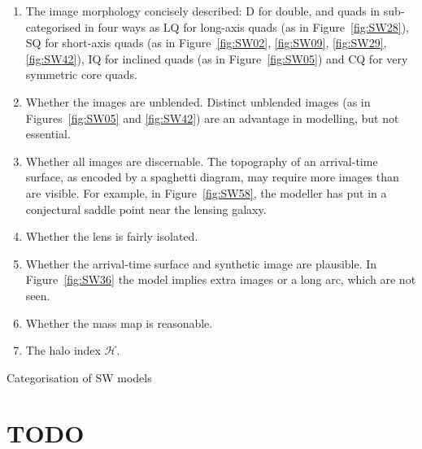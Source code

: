 \documentclass[fleqn,usenatbib]{mnras}
\newcommand{\figref}[1]{\ref{fig:#1}}
\newcommand{\haloindex}{\mathcal{H}}
\begin{document}
\begin{enumerate}
\item The image morphology concisely described: D for double, and
  quads in sub-categorised in four ways
  \citep[cf.][]{2003AJ....125.2769S} as LQ for long-axis quads (as in
  Figure~\figref{SW28}), SQ for short-axis quads (as in
  Figure~\figref{SW02}, \figref{SW09}, \figref{SW29}, \figref{SW42}),
  IQ for inclined quads (as in Figure~\figref{SW05}) and CQ for very
  symmetric core quads.
\item Whether the images are unblended.  Distinct unblended images (as
  in Figures~\figref{SW05} and \figref{SW42}) are an advantage in
  modelling, but not essential.
\item Whether all images are discernable.  The topography of an
  arrival-time surface, as encoded by a spaghetti diagram, may require
  more images than are visible.  For example, in Figure~\figref{SW58},
  the modeller has put in a conjectural saddle point near the lensing
  galaxy.
\item Whether the lens is fairly isolated.
\item Whether the arrival-time surface and synthetic image are
  plausible.  In Figure~\figref{SW36} the model implies extra images
  or a long arc, which are not seen.
\item Whether the mass map is reasonable.
\item The halo index $\haloindex$.
\end{enumerate}

\begin{table}
  \caption{Categorisation of SW models}
  \label{tab:models}
  
\end{table}







\clearpage

\section{TODO}
\listoftodos

\bsp	%
\label{lastpage}
\end{document}

